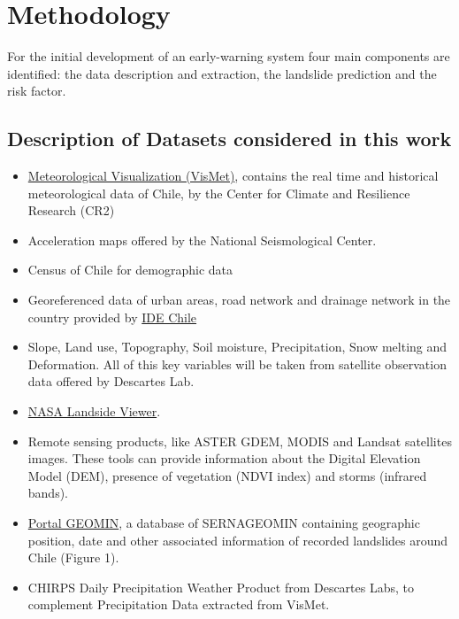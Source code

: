 \documentclass[sigconf, nonacm]{acmart}
\begin{document}

\section{Methodology}

For the initial development of an early-warning system four main components are identified: the data description and extraction, the landslide prediction and the risk factor.

\subsection{Description of Datasets considered in this work}



\begin{itemize}
    \item \href{http://vismet.cr2.cl/}{Meteorological Visualization (VisMet)}, contains the real time and historical meteorological data of Chile, by the Center for Climate and Resilience Research (CR2)
    \item Acceleration maps offered by the National Seismological Center.
    \item Census of Chile for demographic data
    \item Georeferenced data of urban areas, road network and drainage network in the country provided by \href {http://www.ide.cl/}{IDE Chile}
    \item Slope, Land use, Topography, Soil moisture, Precipitation, Snow melting and Deformation. All of this key variables will be taken from satellite observation data offered by Descartes Lab.
    \item \href{https://maps.nccs.nasa.gov/arcgis/apps/webappviewer/index.html?id=824ea5864ec8423fb985b33ee6bc05b7}{NASA Landside Viewer}.
    \item Remote sensing products, like ASTER GDEM, MODIS and Landsat satellites images. These tools can provide information about the Digital Elevation Model (DEM), presence of vegetation (NDVI index) and storms (infrared bands).
    \item \href{https://portalgeominbeta.sernageomin.cl/}{Portal GEOMIN}, a database of SERNAGEOMIN containing geographic position, date and other associated information of recorded landslides around Chile (Figure 1).
    \item CHIRPS Daily Precipitation Weather Product from Descartes Labs, to complement Precipitation Data extracted from VisMet.
\end{itemize}
\end{document}
